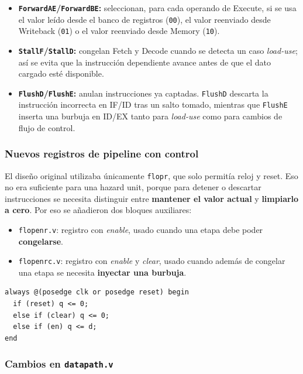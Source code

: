 \documentclass[11pt,a4paper]{article}
\begin{document}
\begin{itemize}
	\item \textbf{\texttt{ForwardAE}/\texttt{ForwardBE}:} seleccionan, para cada operando
	      de Execute, si se usa el valor leído desde el banco de registros
	      (\texttt{00}), el valor reenviado desde Writeback (\texttt{01}) o el valor
	      reenviado desde Memory (\texttt{10}).
	\item \textbf{\texttt{StallF}/\texttt{StallD}:} congelan Fetch y Decode cuando se
	      detecta un caso \textit{load-use}; así se evita que la instrucción dependiente
	      avance antes de que el dato cargado esté disponible.
	\item \textbf{\texttt{FlushD}/\texttt{FlushE}:} anulan instrucciones ya captadas.
	      \texttt{FlushD} descarta la instrucción incorrecta en IF/ID tras un salto tomado,
	      mientras que \texttt{FlushE} inserta una burbuja en ID/EX tanto para \textit{load-use}
	      como para cambios de flujo de control.
\end{itemize}

\subsubsection{Nuevos registros de pipeline con control}

El diseño original utilizaba únicamente \texttt{flopr}, que solo permitía reloj y reset.
Eso no era suficiente para una hazard unit, porque para detener o descartar instrucciones
se necesita distinguir entre \textbf{mantener el valor actual} y \textbf{limpiarlo a
	cero}. Por eso se añadieron dos bloques auxiliares:

\begin{itemize}
	\item \texttt{flopenr.v}: registro con \textit{enable}, usado cuando una etapa debe
	      poder \textbf{congelarse}.
	\item \texttt{flopenrc.v}: registro con \textit{enable} y \textit{clear}, usado cuando
	      además de congelar una etapa se necesita \textbf{inyectar una burbuja}.
\end{itemize}

\begin{lstlisting}
always @(posedge clk or posedge reset) begin
  if (reset) q <= 0;
  else if (clear) q <= 0;
  else if (en) q <= d;
end
\end{lstlisting}

\subsubsection{Cambios en \texttt{datapath.v}}
\end{document}
